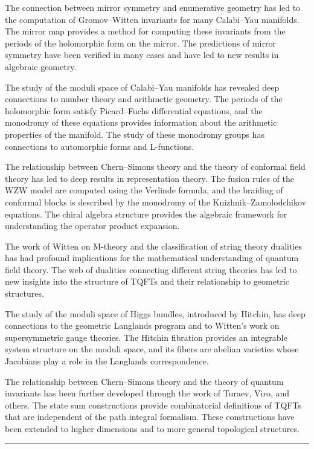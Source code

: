 The connection between mirror symmetry and enumerative geometry has led to the computation of Gromov--Witten invariants for many Calabi--Yau manifolds. The mirror map provides a method for computing these invariants from the periods of the holomorphic form on the mirror. The predictions of mirror symmetry have been verified in many cases and have led to new results in algebraic geometry.

The study of the moduli space of Calabi--Yau manifolds has revealed deep connections to number theory and arithmetic geometry. The periods of the holomorphic form satisfy Picard--Fuchs differential equations, and the monodromy of these equations provides information about the arithmetic properties of the manifold. The study of these monodromy groups has connections to automorphic forms and L-functions.

The relationship between Chern--Simons theory and the theory of conformal field theory has led to deep results in representation theory. The fusion rules of the WZW model are computed using the Verlinde formula, and the braiding of conformal blocks is described by the monodromy of the Knizhnik--Zamolodchikov equations. The chiral algebra structure provides the algebraic framework for understanding the operator product expansion.

The work of Witten on M-theory and the classification of string theory dualities has had profound implications for the mathematical understanding of quantum field theory. The web of dualities connecting different string theories has led to new insights into the structure of TQFTs and their relationship to geometric structures.

The study of the moduli space of Higgs bundles, introduced by Hitchin, has deep connections to the geometric Langlands program and to Witten's work on supersymmetric gauge theories. The Hitchin fibration provides an integrable system structure on the moduli space, and its fibers are abelian varieties whose Jacobians play a role in the Langlands correspondence.

The relationship between Chern--Simons theory and the theory of quantum invariants has been further developed through the work of Turaev, Viro, and others. The state sum constructions provide combinatorial definitions of TQFTs that are independent of the path integral formalism. These constructions have been extended to higher dimensions and to more general topological structures.

\begin{center}\rule{0.5\linewidth}{0.5pt}\end{center}

